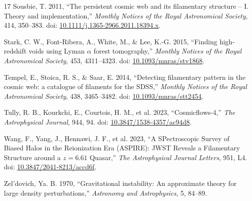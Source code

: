 \documentclass[11pt,a4paper]{article}
\begin{document}
\begin{thebibliography}{17}
Sousbie, T. 2011,
``The persistent cosmic web and its filamentary structure -- I. Theory and implementation,''
\emph{Monthly Notices of the Royal Astronomical Society}, 414, 350--383.
doi: \href{https://doi.org/10.1111/j.1365-2966.2011.18394.x}{10.1111/j.1365-2966.2011.18394.x}.

Stark, C. W., Font-Ribera, A., White, M., \& Lee, K.-G. 2015,
``Finding high-redshift voids using Lyman $\alpha$ forest tomography,''
\emph{Monthly Notices of the Royal Astronomical Society}, 453, 4311--4323.
doi: \href{https://doi.org/10.1093/mnras/stv1868}{10.1093/mnras/stv1868}.

Tempel, E., Stoica, R. S., \& Saar, E. 2014,
``Detecting filamentary pattern in the cosmic web: a catalogue of filaments for the SDSS,''
\emph{Monthly Notices of the Royal Astronomical Society}, 438, 3465--3482.
doi: \href{https://doi.org/10.1093/mnras/stt2454}{10.1093/mnras/stt2454}.

Tully, R. B., Kourkchi, E., Courtois, H. M., et al. 2023,
``Cosmicflows-4,''
\emph{The Astrophysical Journal}, 944, 94.
doi: \href{https://doi.org/10.3847/1538-4357/ac94d8}{10.3847/1538-4357/ac94d8}.

Wang, F., Yang, J., Hennawi, J. F., et al. 2023,
``A SPectroscopic Survey of Biased Halos in the Reionization Era (ASPIRE): JWST Reveals a Filamentary Structure around a $z=6.61$ Quasar,''
\emph{The Astrophysical Journal Letters}, 951, L4.
doi: \href{https://doi.org/10.3847/2041-8213/accd6f}{10.3847/2041-8213/accd6f}.

Zel'dovich, Ya. B. 1970,
``Gravitational instability: An approximate theory for large density perturbations,''
\emph{Astronomy and Astrophysics}, 5, 84--89.

\end{thebibliography}
\end{document}
